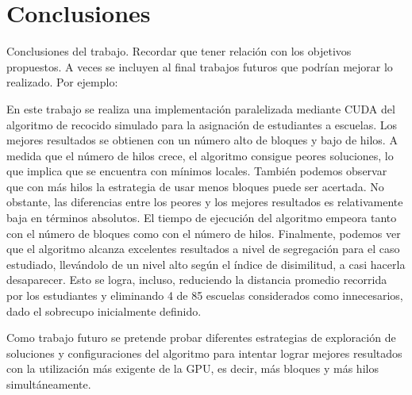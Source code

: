 \chapter{Conclusiones}

Conclusiones del trabajo. Recordar que tener relación con los objetivos propuestos. A veces se incluyen al final trabajos futuros que podrían mejorar lo realizado. Por ejemplo:

En este trabajo se realiza una implementación paralelizada mediante CUDA del algoritmo de recocido simulado para la asignación de estudiantes a escuelas. Los mejores resultados se obtienen con un número alto de bloques y bajo de hilos. A medida que el número de hilos crece, el algoritmo consigue peores soluciones, lo que implica que se encuentra con mínimos locales. También podemos observar que con más hilos la estrategia de usar menos bloques puede ser acertada. No obstante, las diferencias entre los peores y los mejores resultados es relativamente baja en términos absolutos. El tiempo de ejecución del algoritmo empeora tanto con el número de bloques como con el número de hilos. Finalmente, podemos ver que el algoritmo alcanza excelentes resultados a nivel de segregación para el caso estudiado, llevándolo de un nivel alto según el índice de disimilitud, a casi hacerla desaparecer. Esto se logra, incluso, reduciendo la distancia promedio recorrida por los estudiantes y eliminando 4 de 85 escuelas considerados como innecesarios, dado el sobrecupo inicialmente definido.

Como trabajo futuro se pretende probar diferentes estrategias de exploración de soluciones y configuraciones del algoritmo para intentar lograr mejores resultados con la utilización más exigente de la GPU, es decir, más bloques y más hilos simultáneamente.